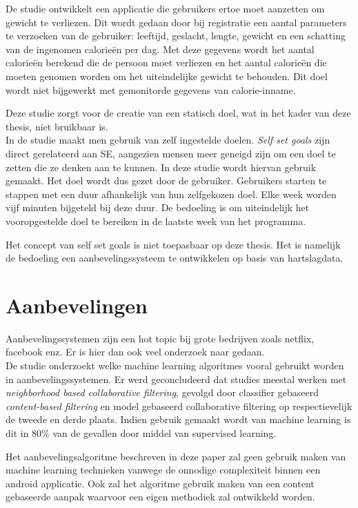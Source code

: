 De studie \citep{ref20} ontwikkelt een applicatie die gebruikers ertoe moet aanzetten om gewicht te verliezen. Dit wordt gedaan door bij registratie een aantal parameters te verzoeken van de gebruiker: leeftijd, geslacht, lengte, gewicht en een schatting van de ingenomen calorieën per dag. Met deze gegevens wordt het aantal calorieën berekend die de persoon moet verliezen en het aantal calorieën die moeten genomen worden om het uiteindelijke gewicht te behouden. Dit doel wordt niet bijgewerkt met gemonitorde gegevens van calorie-inname.

Deze studie zorgt voor de creatie van een statisch doel, wat in het kader van deze thesis, niet bruikbaar is.\\

In de studie \citep{ref22} maakt men gebruik van zelf ingestelde doelen.
\textit{Self set goals} zijn direct gerelateerd aan SE, aangezien mensen meer geneigd zijn om een doel te zetten die ze denken aan te kunnen. In deze studie wordt hiervan gebruik gemaakt. Het doel wordt dus gezet door de gebruiker. Gebruikers starten te stappen met een duur afhankelijk van hun zelfgekozen doel. Elke week worden vijf minuten bijgeteld bij deze duur. De bedoeling is om uiteindelijk het vooropgestelde doel te bereiken in de laatste week van het programma.

Het concept van self set goals is niet toepasbaar op deze thesis. Het is namelijk de bedoeling een aanbevelingssysteem te ontwikkelen op basis van hartslagdata.

\section{Aanbevelingen}
Aanbevelingssystemen zijn een hot topic bij grote bedrijven zoals netflix, facebook enz. Er is hier dan ook veel onderzoek naar gedaan.\\

De studie \citep{ref12} onderzoekt welke machine learning algoritmes vooral gebruikt worden in aanbevelingssystemen. Er werd geconcludeerd dat studies meestal werken met \textit{neighborhood based collaborative filtering}, gevolgd door classifier gebaseerd \textit{content-based filtering} en model gebaseerd collaborative filtering op respectievelijk de tweede en derde plaats. Indien gebruik gemaakt wordt van machine learning is dit in 80\% van de gevallen door middel van supervised learning.

Het aanbevelingsalgoritme beschreven in deze paper zal geen gebruik maken van machine learning technieken vanwege de onnodige complexiteit binnen een android applicatie. Ook zal het algoritme gebruik maken van een content gebaseerde aanpak waarvoor een eigen methodiek zal ontwikkeld worden. \\

